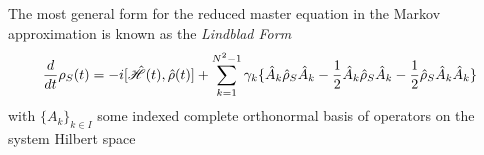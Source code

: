 The most general form\autocite[119--122]{Breuer2002} for the reduced master equation in the Markov approximation is known as the \emph{Lindblad Form}
\begin{equation}
	\frac{d}{dt} \rho_S (t) = -i[\hat{\mathscr{H}} (t), \hat{\rho} (t)] + \sum_{k=1}^{N^2-1} \gamma_k \{ \hat{A}_k \hat{\rho}_S \hat{A}_k -\frac{1}{2}  \hat{A}_k \hat{\rho}_S \hat{A}_k -\frac{1}{2} \hat{\rho}_S \hat{A}_k \hat{A}_k \}
\end{equation}
with $\{A_k\}_{k \in I}$ some indexed complete orthonormal basis of operators on the system Hilbert space
